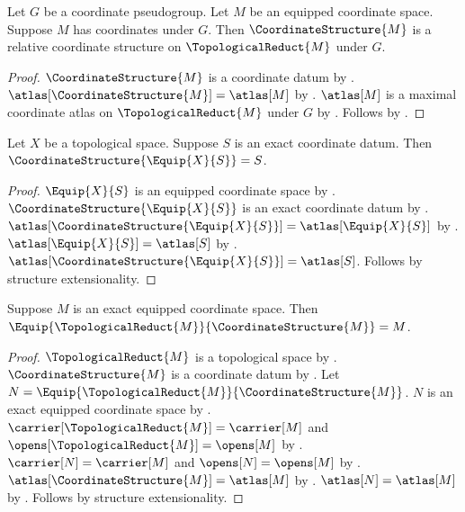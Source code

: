 \begin{classification}\label{coordinate_structure_relative}
    Let $G$ be a coordinate pseudogroup.
    Let $M$ be an equipped coordinate space.
    Suppose $M$ has coordinates under $G$.
    Then $\CoordinateStructure{M}$ is a relative coordinate structure
        on $\TopologicalReduct{M}$ under $G$.
\end{classification}
\begin{proof}
    $\CoordinateStructure{M}$ is a coordinate datum by .
    $\atlas[\CoordinateStructure{M}]=\atlas[M]$ by
        .
    $\atlas[M]$ is a maximal coordinate atlas on $\TopologicalReduct{M}$ under $G$
        by .
    Follows by .
\end{proof}

\begin{theorem}\label{coordinate_structure_of_equip}
    Let $X$ be a topological space.
    Suppose $S$ is an exact coordinate datum.
    Then $\CoordinateStructure{\Equip{X}{S}}=S$.
\end{theorem}
\begin{proof}
    $\Equip{X}{S}$ is an equipped coordinate space by .
    $\CoordinateStructure{\Equip{X}{S}}$ is an exact coordinate datum by
        .
    $\atlas[\CoordinateStructure{\Equip{X}{S}}]=\atlas[\Equip{X}{S}]$ by
        .
    $\atlas[\Equip{X}{S}]=\atlas[S]$ by .
    $\atlas[\CoordinateStructure{\Equip{X}{S}}]=\atlas[S]$.
    Follows by structure extensionality.
\end{proof}

\begin{theorem}\label{equip_coordinate_structure}
    Suppose $M$ is an exact equipped coordinate space.
    Then $\Equip{\TopologicalReduct{M}}{\CoordinateStructure{M}}=M$.
\end{theorem}
\begin{proof}
    $\TopologicalReduct{M}$ is a topological space by
        .
    $\CoordinateStructure{M}$ is a coordinate datum by .
    Let $N=\Equip{\TopologicalReduct{M}}{\CoordinateStructure{M}}$.
    $N$ is an exact equipped coordinate space by .
    $\carrier[\TopologicalReduct{M}]=\carrier[M]$ and
        $\opens[\TopologicalReduct{M}]=\opens[M]$ by
        .
    $\carrier[N]=\carrier[M]$ and $\opens[N]=\opens[M]$ by
        .
    $\atlas[\CoordinateStructure{M}]=\atlas[M]$ by
        .
    $\atlas[N]=\atlas[M]$ by .
    Follows by structure extensionality.
\end{proof}

